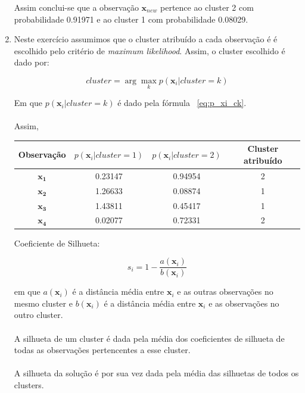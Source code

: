\documentclass[a4paper,12pt]{article} %
\begin{document}
\begin{enumerate}
Assim conclui-se que a observação $\mathbf{x}_{new}$ pertence ao cluster 2 com probabilidade 0.91971
e ao cluster 1 com probabilidade 0.08029.

\item Neste exercício assumimos que o cluster atribuído a cada observação é 
é escolhido pelo critério de \textit{maximum likelihood}.
Assim, o cluster escolhido é dado por:

\begin{equation}
    cluster = \arg\max_k p(\mathbf{x}_i|cluster = k)
\end{equation}

Em que $p(\mathbf{x}_i|cluster = k)$ é dado pela fórmula ~\eqref{eq:p_xi_ck}. \\ \\

Assim,

\begin{table}[H]
\centering
\begin{tabular}{|c|c|c|c|}
\hline
Observação & $p(\mathbf{x}_i|cluster = 1)$ & $p(\mathbf{x}_i|cluster = 2)$ & Cluster atribuído\\ \hline
$\mathbf{x_1}$ &  0.23147  & 0.94954 & 2 \\ \hline
$\mathbf{x_2}$ &  1.26633  & 0.08874 & 1 \\ \hline
$\mathbf{x_3}$ &  1.43811  & 0.45417 & 1 \\ \hline
$\mathbf{x_4}$ &  0.02077  & 0.72331 & 2 \\ \hline
\end{tabular}
\end{table}


Coeficiente de Silhueta:

\begin{equation}
    s_i = 1 - \frac{a(\mathbf{x}_i)}{b(\mathbf{x}_i)}
\end{equation}

em que $a(\mathbf{x}_i)$ é a distância média entre $\mathbf{x}_i$ e as outras 
observações no mesmo cluster e $b(\mathbf{x}_i)$ é a distância média entre 
$\mathbf{x}_i$ e as observações no outro cluster. \\ \\

A silhueta de um cluster é dada pela média dos coeficientes de silhueta de todas
as observações pertencentes a esse cluster. \\ \\

A silhueta da solução é por sua vez dada pela média das silhuetas de todos os
clusters. \\ \\


\end{enumerate}
\end{document}
